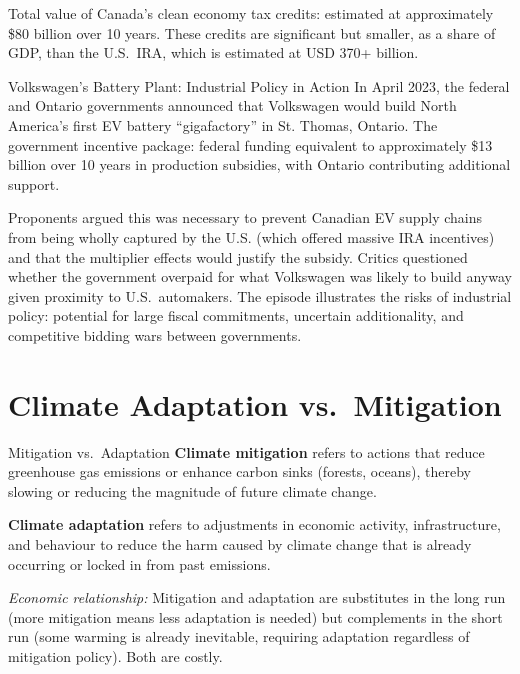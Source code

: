 Total value of Canada's clean economy tax credits: estimated at approximately \$80 billion over 10 years. These credits are significant but smaller, as a share of GDP, than the U.S.\ IRA, which is estimated at USD 370+ billion.

\begin{canexample}{Volkswagen's Battery Plant: Industrial Policy in Action}
In April 2023, the federal and Ontario governments announced that Volkswagen would
build North America's first EV battery ``gigafactory'' in St. Thomas, Ontario.
The government incentive package: federal funding equivalent to approximately
\$13 billion over 10 years in production subsidies, with Ontario contributing
additional support.

Proponents argued this was necessary to prevent Canadian EV supply chains from being
wholly captured by the U.S. (which offered massive IRA incentives) and that the
multiplier effects would justify the subsidy. Critics questioned whether the
government overpaid for what Volkswagen was likely to build anyway given proximity
to U.S.\ automakers. The episode illustrates the risks of industrial policy:
potential for large fiscal commitments, uncertain additionality, and competitive
bidding wars between governments.
\end{canexample}

\section{Climate Adaptation vs.\ Mitigation}

\begin{defbox}{Mitigation vs.\ Adaptation}
\textbf{Climate mitigation} refers to actions that reduce greenhouse gas emissions or enhance carbon sinks (forests, oceans), thereby slowing or reducing the magnitude of future climate change.

\textbf{Climate adaptation} refers to adjustments in economic activity, infrastructure, and behaviour to reduce the harm caused by climate change that is already occurring or locked in from past emissions.

\textit{Economic relationship:} Mitigation and adaptation are substitutes in the long run (more mitigation means less adaptation is needed) but complements in the short run (some warming is already inevitable, requiring adaptation regardless of mitigation policy). Both are costly.
\end{defbox}

